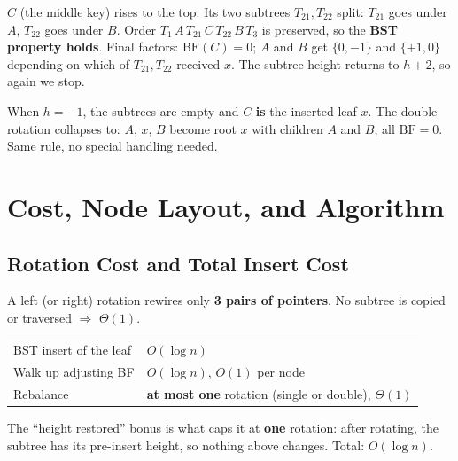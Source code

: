 \documentclass[11pt]{article}
\begin{document}
\begin{examplebox}
$C$ (the middle key) rises to the top. Its two subtrees $T_{21}, T_{22}$ split: $T_{21}$ goes under $A$, $T_{22}$ goes under $B$. Order $T_1\, A\, T_{21}\, C\, T_{22}\, B\, T_3$ is preserved, so the \textbf{BST property holds}. Final factors: $\text{BF}(C)=0$; $A$ and $B$ get $\{0, -1\}$ and $\{+1, 0\}$ depending on which of $T_{21}, T_{22}$ received $x$. The subtree height returns to $h+2$, so again we \textcolor{greenO}{stop}.
\end{examplebox}

\begin{keybox}[Special case $h = -1$]
When $h=-1$, the subtrees are empty and $C$ \textbf{is} the inserted leaf $x$. The double rotation collapses to: $A$, $x$, $B$ become root $x$ with children $A$ and $B$, all $\text{BF}=0$. Same rule, no special handling needed.
\end{keybox}

\section{Cost, Node Layout, and Algorithm}

\subsection{Rotation Cost and Total Insert Cost}

\begin{keybox}
A left (or right) rotation rewires only \textbf{3 pairs of pointers}. No subtree is copied or traversed $\Rightarrow$ \textcolor{greenO}{$\Theta(1)$}.
\end{keybox}

\begin{keybox}
\renewcommand{\arraystretch}{1.3}
\begin{tabular}{l l}
BST insert of the leaf & $O(\log n)$ \\
Walk up adjusting BF & $O(\log n)$, \; $O(1)$ per node \\
Rebalance & \textbf{at most one} rotation (single or double), $\Theta(1)$ \\
\end{tabular}

The ``height restored'' bonus is what caps it at \textbf{one} rotation: after rotating, the subtree has its pre-insert height, so nothing above changes. Total: \textcolor{violetT}{$O(\log n)$}.
\end{keybox}
\end{document}
